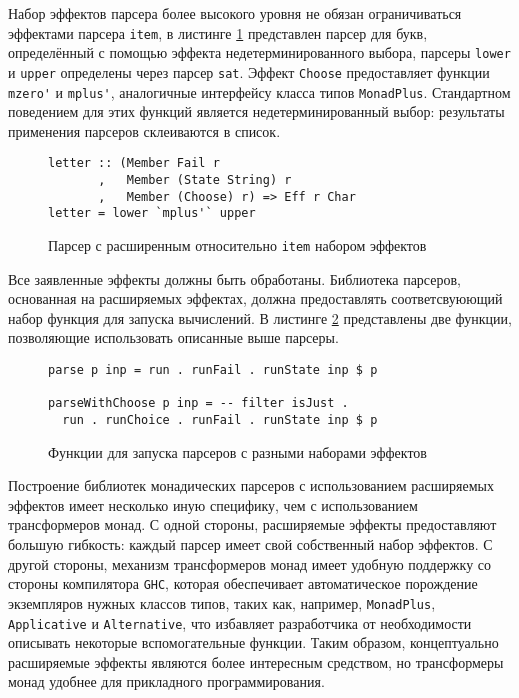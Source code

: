 Набор эффектов парсера более высокого уровня не обязан ограничиваться эффектами парсера \lstinline{item}, в листинге \ref{listing:ExtEffectsMpus} представлен парсер для букв, определённый с помощью эффекта недетерминированного выбора, парсеры \lstinline{lower} и \lstinline{upper} определены через парсер \lstinline{sat}. Эффект \lstinline{Choose} предоставляет функции \lstinline{mzero'} и \lstinline{mplus'}, аналогичные интерфейсу класса типов \lstinline{MonadPlus}. Стандартном поведением для этих функций является недетерминированный выбор: результаты применения парсеров склеиваются в список.  

\begin{figure}[t]
\begin{lstlisting}
letter :: (Member Fail r
       ,   Member (State String) r
       ,   Member (Choose) r) => Eff r Char
letter = lower `mplus'` upper
\end{lstlisting}
\caption{Парсер с расширенным относительно \lstinline{item} набором эффектов}
\label{listing:ExtEffectsMpus}
\end{figure}

Все заявленные эффекты должны быть обработаны. Библиотека парсеров, основанная на расширяемых эффектах, должна предоставлять соответсвуюющий набор функция для запуска вычислений. В листинге \ref{listing:ExtEffectsRunners} представлены две функции, позволяющие использовать описанные выше парсеры.

\begin{figure}[t]
\begin{lstlisting}
parse p inp = run . runFail . runState inp $ p

parseWithChoose p inp = -- filter isJust . 
  run . runChoice . runFail . runState inp $ p 
\end{lstlisting}
\caption{Функции для запуска парсеров с разными наборами эффектов}
\label{listing:ExtEffectsRunners}
\end{figure}

Построение библиотек монадических парсеров с использованием расширяемых эффектов имеет несколько иную специфику, чем с использованием трансформеров монад. С одной стороны, расширяемые эффекты предоставляют большую гибкость: каждый парсер имеет свой собственный набор эффектов. С другой стороны, механизм трансформеров монад имеет удобную поддержку со стороны компилятора \lstinline{GHC}, которая обеспечивает автоматическое порождение экземпляров нужных классов типов, таких как, например, \lstinline{MonadPlus}, \lstinline{Applicative} и \lstinline{Alternative}, что избавляет разработчика от необходимости описывать некоторые вспомогательные функции. Таким образом, концептуально расширяемые эффекты являются более интересным средством, но трансформеры монад удобнее для прикладного программирования.    

